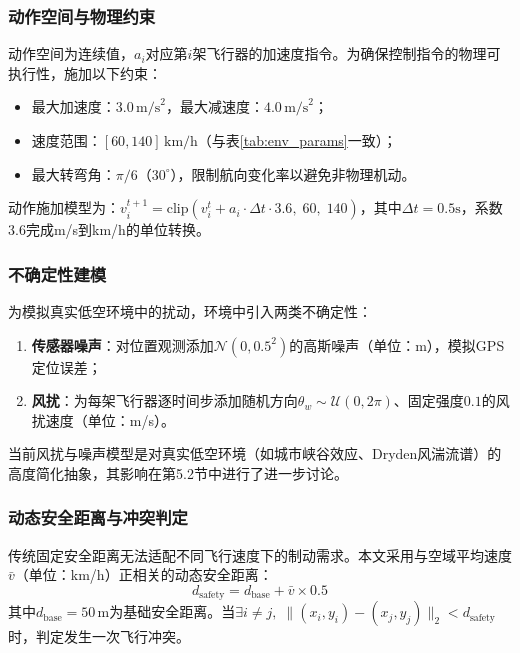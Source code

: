 \documentclass[12pt,a4paper,UTF8]{ctexart}
\begin{document}
\subsubsection{动作空间与物理约束}

动作空间为连续值，$a_i$对应第$i$架飞行器的加速度指令。为确保控制指令的物理可执行性，施加以下约束：
\begin{itemize}
    \item 最大加速度：$3.0\,\text{m/s}^2$，最大减速度：$4.0\,\text{m/s}^2$；
    \item 速度范围：$[60, 140]\,\text{km/h}$（与表\ref{tab:env_params}一致）；
    \item 最大转弯角：$\pi/6$（$30^\circ$），限制航向变化率以避免非物理机动。
\end{itemize}

动作施加模型为：$v_i^{t+1} = \text{clip}(v_i^{t} + a_i \cdot \Delta t \cdot 3.6,\; 60,\; 140)$，其中$\Delta t = 0.5\text{s}$，系数3.6完成m/s到km/h的单位转换。

\subsubsection{不确定性建模}

为模拟真实低空环境中的扰动，环境中引入两类不确定性：
\begin{enumerate}[label=(\arabic*)]
    \item \textbf{传感器噪声}：对位置观测添加$\mathcal{N}(0, 0.5^2)$的高斯噪声（单位：m），模拟GPS定位误差；
    \item \textbf{风扰}：为每架飞行器逐时间步添加随机方向$\theta_w \sim \mathcal{U}(0, 2\pi)$、固定强度$0.1$的风扰速度（单位：m/s）。
\end{enumerate}

当前风扰与噪声模型是对真实低空环境（如城市峡谷效应、Dryden风湍流谱）的高度简化抽象，其影响在第5.2节中进行了进一步讨论。

\subsubsection{动态安全距离与冲突判定}

传统固定安全距离无法适配不同飞行速度下的制动需求\cite{ref7}。本文采用与空域平均速度$\bar{v}$（单位：km/h）正相关的动态安全距离：
\begin{equation}
    d_{\text{safety}} = d_{\text{base}} + \bar{v} \times 0.5
    \label{eq:dynamicsafety}
\end{equation}
其中$d_{\text{base}} = 50\,\text{m}$为基础安全距离。当$\exists i \neq j,\; \|(x_i, y_i) - (x_j, y_j)\|_2 < d_{\text{safety}}$时，判定发生一次飞行冲突。
\end{document}
